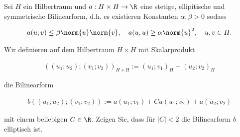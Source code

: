 
\begin{exercise}
Sei $H$ ein Hilbertraum und $a: H \times H \rightarrow \R$ eine stetige,
ellipitische und symmetrische Bilinearform, d.h. es existieren Konstanten
$\alpha, \beta > 0$ sodass

\begin{align*}
  a(u;v)
  \leq
  \beta \norm{u}\norm{v},
  \quad
  a(u,u) \geq \alpha \norm{u}^2,
  \quad
  u,v \in H.
\end{align*}

Wir definieren auf dem Hilbertraum $H \times H$ mit Skalarprodukt

\begin{align*}
  ((u_1;u_2);(v_1;v_2))_{H \times H} := (u_1;v_1)_H + (u_2;v_2)_H
\end{align*}

die Bilinearform

\begin{align*}
  b((u_1;u_2);(v_1;v_2)) := a(u_1;v_1) + Ca(u_1;v_2) + a(u_2;v_2)
\end{align*}

mit einem beliebigen $C \in \R$. Zeigen Sie, dass für $|C| < 2$ die Bilinearform $b$
elliptisch ist.
\end{exercise}


\begin{solution}

\end{solution}

